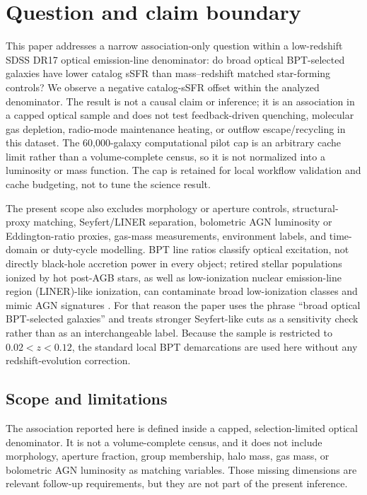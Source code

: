 \documentclass[twocolumn]{aastex631}
\begin{document}
\section{Question and claim boundary}
This paper addresses a narrow association-only question within a low-redshift SDSS DR17 optical emission-line denominator: do broad optical BPT-selected galaxies have lower catalog sSFR than mass--redshift matched star-forming controls? We observe a negative catalog-sSFR offset within the analyzed denominator. The result is not a causal claim or inference; it is an association in a capped optical sample and does not test feedback-driven quenching, molecular gas depletion, radio-mode maintenance heating, or outflow escape/recycling in this dataset. The 60,000-galaxy computational pilot cap is an arbitrary cache limit rather than a volume-complete census, so it is not normalized into a luminosity or mass function. The cap is retained for local workflow validation and cache budgeting, not to tune the science result.


The present scope also excludes morphology or aperture controls, structural-proxy matching, Seyfert/LINER separation, bolometric AGN luminosity or Eddington-ratio proxies, gas-mass measurements, environment labels, and time-domain or duty-cycle modelling. BPT line ratios classify optical excitation, not directly black-hole accretion power in every object; retired stellar populations ionized by hot post-AGB stars, as well as low-ionization nuclear emission-line region (LINER)-like ionization, can contaminate broad low-ionization classes and mimic AGN signatures \citep{cidfernandes2011,stasinska2008,stasinska2015}. For that reason the paper uses the phrase ``broad optical BPT-selected galaxies'' and treats stronger Seyfert-like cuts as a sensitivity check rather than as an interchangeable label. Because the sample is restricted to $0.02<z<0.12$, the standard local BPT demarcations are used here without any redshift-evolution correction.

\subsection{Scope and limitations}
The association reported here is defined inside a capped, selection-limited optical denominator. It is not a volume-complete census, and it does not include morphology, aperture fraction, group membership, halo mass, gas mass, or bolometric AGN luminosity as matching variables. Those missing dimensions are relevant follow-up requirements, but they are not part of the present inference.
\end{document}
